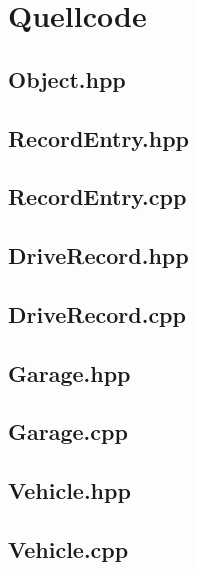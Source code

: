 \documentclass[12pt,naustrian,a4widepaper]{scrartcl}
\begin{document}
\clearpage
\section{Quellcode}

\subsection{Object.hpp}


\subsection{RecordEntry.hpp}


\subsection{RecordEntry.cpp}


\subsection{DriveRecord.hpp}


\subsection{DriveRecord.cpp}


\subsection{Garage.hpp}


\subsection{Garage.cpp}


\subsection{Vehicle.hpp}


\subsection{Vehicle.cpp}

\end{document}
